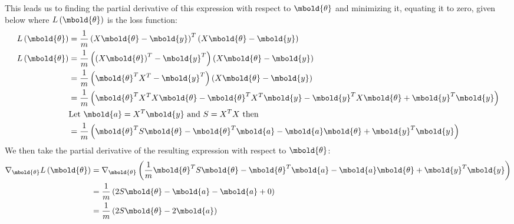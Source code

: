 \documentclass[12pt letter]{report}
\begin{document}
This leads us to finding the partial derivative of this expression with respect to $\mbold{\theta}$ and minimizing it,
equating it to zero, given below where $L \left( \mbold{\theta} \right) $ is the loss function:
\begin{align*}
  L \left( \mbold{\theta} \right) & = \frac{1}{m}\left( X \mbold{\theta} - \mbold{y} \right)^{T} \left( X \mbold{\theta} - \mbold{y}
  \right)                                                                                                                                                                  \\
  L \left( \mbold{\theta} \right) & =\frac{1}{m} \left( \left( X \mbold{\theta} \right)^{T}- \mbold{y}^T  \right) \left( X
  \mbold{\theta} - \mbold{y} \right)                                                                                                                                       \\
                                  & = \frac{1}{m} \left( \mbold{\theta}^{T} X^{T} - \mbold{y}^T  \right) \left( X
  \mbold{\theta} - \mbold{y} \right)                                                                                                                                       \\
                                  & = \frac{1}{m} \left( \mbold{\theta}^{T} X^{T} X \mbold{\theta} - \mbold{\theta}^{T} X^{T} \mbold{y} - \mbold{y}^{T} X \mbold{\theta} +
  \mbold{y}^{T} \mbold{y} \right)                                                                                                                                          \\
                                  & \text{Let } \mbold{a} = X^{T} \mbold{y} \text{ and } S = X^{T} X \text{ then}                                                          \\
                                  & = \frac{1}{m} \left( \mbold{\theta}^{T} S \mbold{\theta} - \mbold{\theta}^{T} \mbold{a} - \mbold{a}
  \mbold{\theta} + \mbold{y}^{T} \mbold{y}  \right)                                                                                                                        \\
\end{align*}
We then take the partial derivative of the resulting expression with respect to $\mbold{\theta}$:
\begin{align*}
  \nabla_{\mbold{\theta}} L \left( \mbold{\theta} \right) & =  \nabla_{\mbold{\theta}} \left( \frac{1}{m}\mbold{\theta}^{T} S \mbold{\theta} - \mbold{\theta}^{T} \mbold{a} - \mbold{a}
  \mbold{\theta} + \mbold{y}^{T} \mbold{y}
  \right)                                                                                                                                                                               \\
                                                          & = \frac{1}{m} \left( 2S \mbold{\theta} - \mbold{a} - \mbold{a} + 0 \right)                                                  \\
                                                          & = \frac{1}{m} \left( 2S \mbold{\theta} - 2 \mbold{a}  \right)                                                               \\
\end{align*}
\end{document}
